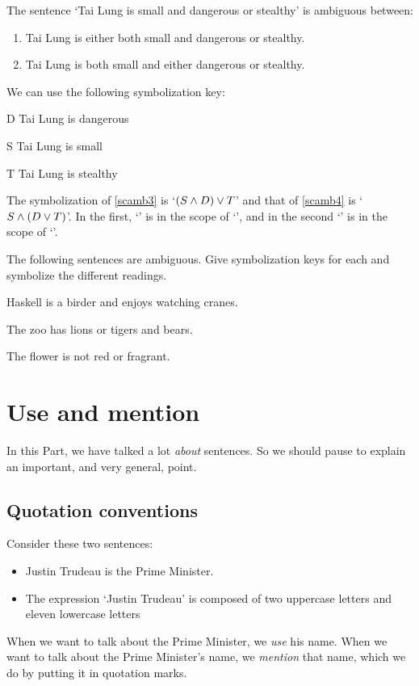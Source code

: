 The sentence `Tai Lung is small and dangerous or stealthy' is ambiguous between:
\begin{enumerate}
	\item\label{scamb3} Tai Lung is either both small and dangerous or stealthy.
	\item\label{scamb4} Tai Lung is both small and either dangerous or stealthy.
\end{enumerate}
We can use the following symbolization key:
\begin{ekey}
	\item[D] Tai Lung is dangerous
	\item[S] Tai Lung is small
	\item[T] Tai Lung is stealthy
\end{ekey}
The symbolization of \cref*{scamb3} is `$(S \wedge D) \vee T$' and that of \cref*{scamb4} is `$S \wedge (D \vee T)$'. In the first, `\eand' is in the scope of `\eor', and in the second `\eor' is in the scope of `\eand'.

\practiceproblems
\solutions
\problempart The following sentences are ambiguous. Give symbolization keys for each and symbolize the different readings.
\begin{compactlist}
	\item Haskell is a birder and enjoys watching cranes.
	\item The zoo has lions or tigers and bears.
	\item The flower is not red or fragrant.
\end{compactlist}

\chapter{Use and mention}\label{s:UseMention}
In this Part, we have talked a lot \emph{about} sentences. So we should pause to explain an important, and very general, point.

\section{Quotation conventions}
Consider these two sentences:
	\begin{itemize}
		\item Justin Trudeau is the Prime Minister.
		\item The expression `Justin Trudeau' is composed of two uppercase letters and eleven lowercase letters
	\end{itemize}
When we want to talk about the Prime Minister, we \emph{use} his name. When we want to talk about the Prime Minister's name, we \emph{mention} that name, which we do by putting it in quotation marks.

